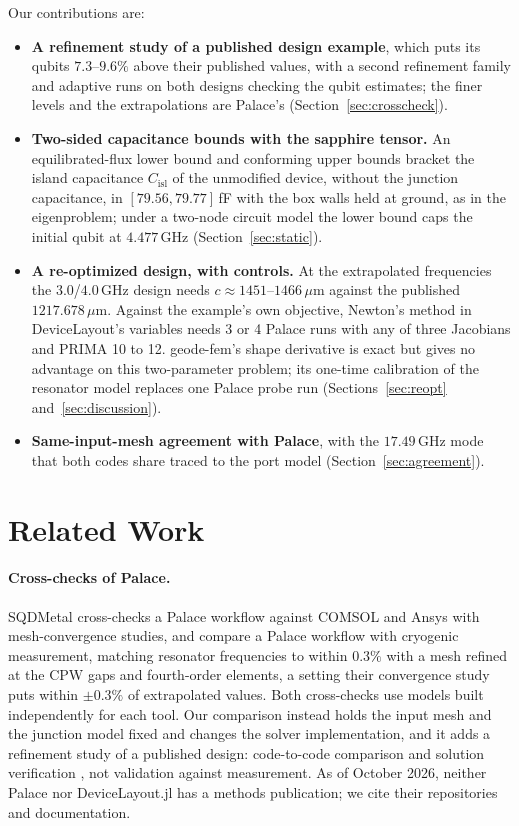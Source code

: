 \documentclass{anvil-paper}
\newcommand{\Cisl}{C_{\mathrm{isl}}}
\begin{document}
Our contributions are:
\begin{itemize}
  \item \textbf{A refinement study of a published design example}, which
    puts its qubits $7.3$--$9.6\%$ above their published values, with a
    second refinement family and adaptive runs on both designs checking
    the qubit estimates; the finer levels and the extrapolations are
    Palace's (Section~\ref{sec:crosscheck}).
  \item \textbf{Two-sided capacitance bounds with the sapphire tensor.}
    An equilibrated-flux lower bound and conforming upper bounds bracket
    the island capacitance $\Cisl$ of the unmodified device, without the
    junction capacitance, in $[79.56, 79.77]$\,fF with the box walls held
    at ground, as in the eigenproblem; under a two-node circuit model the
    lower bound caps the initial qubit at $4.477$\,GHz
    (Section~\ref{sec:static}).
  \item \textbf{A re-optimized design, with controls.} At the extrapolated
    frequencies the $3.0$/$4.0$\,GHz design needs $c \approx
    1451$--$1466\,\mu$m against the published $1217.678\,\mu$m. Against
    the example's own objective, Newton's method in DeviceLayout's
    variables needs 3 or 4 Palace runs with any of three Jacobians and
    PRIMA 10 to 12. geode-fem's shape derivative is exact but gives no
    advantage on this two-parameter problem; its one-time calibration of
    the resonator model replaces one Palace probe run
    (Sections~\ref{sec:reopt} and~\ref{sec:discussion}).
  \item \textbf{Same-input-mesh agreement with Palace}, with the
    $17.49$\,GHz mode that both codes share traced to the port model
    (Section~\ref{sec:agreement}).
\end{itemize}

\section{Related Work}
\label{sec:related}

\paragraph{Cross-checks of Palace.}
SQDMetal \citep{sommers2025open} cross-checks a Palace workflow against
COMSOL and Ansys with mesh-convergence studies, and
\citet{ye2025electromagnetic} compare a Palace workflow with cryogenic
measurement, matching resonator frequencies to within $0.3\%$ with a mesh
refined at the CPW gaps and fourth-order elements, a setting their
convergence study puts within $\pm0.3\%$ of extrapolated values. Both cross-checks use models built
independently for each tool. Our comparison instead holds the input mesh
and the junction model fixed and changes the solver implementation, and it
adds a refinement study of a published design: code-to-code comparison and
solution verification \citep{oberkampf2010verification}, not validation
against measurement. As of October 2026, neither Palace nor DeviceLayout.jl has a
methods publication; we cite their repositories and documentation.
\end{document}
